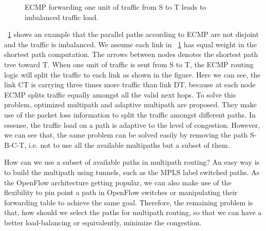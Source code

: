 \documentclass[conference]{IEEEtran}
\begin{document}
\begin{figure}
\begin{center}
\end{center}
\caption{ECMP forwarding one unit of traffic from S to T leads to imbalanced traffic load.}\label{fig:badecmp}
\end{figure}

\figurename~\ref{fig:badecmp} shows an example that the parallel
paths according to ECMP are not disjoint and the traffic is imbalanced. We
assume each link in \figurename~\ref{fig:badecmp} has equal weight in the
shortest path computation. The arrows between nodes denotes the shortest path
tree toward T. When one unit of traffic is sent from S to T, the ECMP routing
logic will split the traffic to each link as shown in the figure. Here we can
see, the link CT is carrying three times more traffic than link DT, because at
each node ECMP splits traffic equally amongst all the valid next hops. To solve
this problem, optimized multipath \cite{ospfomp} and adaptive multipath
\cite{gzrr03} are proposed. They make use of the packet loss information to
split the traffic amongst different paths. In essense, the traffic load on a
path is adaptive to the level of congestion. However, we can see that, the same
problem can be solved easily by removing the path S-B-C-T, i.e. not to use all
the available multipaths but a subset of them.

How can we use a subset of available paths in multipath routing? An easy way is
to build the multipath using tunnels, such as the MPLS label switched paths. As
the OpenFlow architecture \cite{mabpprst08} getting popular, we can also make
use of the flexibility to pin point a path in OpenFlow switches or manipulating
their forwarding table to achieve the same goal. Therefore, the remaining
problem is that, how should we select the paths for multipath routing, so that
we can have a better load-balancing or equivalently, minimize the congestion.
\end{document}
